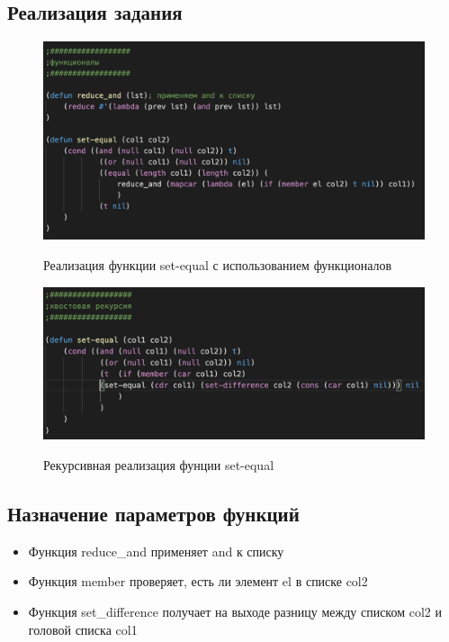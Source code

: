 \documentclass[a4paper,12pt]{article}
\begin{document}
 	\newpage
 
 	\subsection*{Реализация задания}
 	
 	\begin{figure}[h!]
 		\begin{center}
 			{\includegraphics[scale = 0.8]{5.2f.png}}
 			\label{ris:5.2f}
 		\end{center}
 	\caption{Реализация функции set-equal с использованием функционалов}
 	\end{figure}
 
  	\begin{figure}[h!]
 	\begin{center}
 		{\includegraphics[scale = 0.8]{5.2r.png}}
 		\label{ris:5.2r}
 	\end{center}
 \caption{Рекурсивная реализация фунции set-equal}
 \end{figure}
 	
 	\newpage
 	
 	\subsection*{Назначение параметров функций}
 	
 	\begin{itemize}
 		\item Функция reduce\_and применяет and к списку
 		\item Функция member проверяет, есть ли элемент el в списке col2
 		\item Функция set\_difference получает на выходе разницу между списком col2 и головой списка col1
 	\end{itemize}
 	
\end{document}
